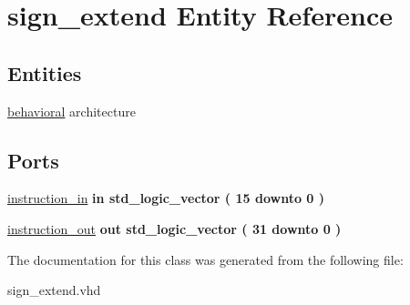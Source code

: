 \hypertarget{classsign__extend}{\section{sign\-\_\-extend \-Entity \-Reference}
\label{classsign__extend}
}
\subsection*{\-Entities}
\begin{DoxyCompactItemize}
\item 
\hyperlink{classsign__extend_1_1behavioral}{behavioral} architecture
\end{DoxyCompactItemize}
\*
\*
\subsection*{\-Ports}
 \begin{DoxyCompactItemize}
\item 
\hypertarget{classsign__extend_aa9a13c51cd81134d998a1f8fbee3010f}{\hyperlink{classsign__extend_aa9a13c51cd81134d998a1f8fbee3010f}{instruction\-\_\-in}  {\bfseries {\bfseries in }} {\bfseries std\-\_\-logic\-\_\-vector (   15    downto    0  ) } }\label{classsign__extend_aa9a13c51cd81134d998a1f8fbee3010f}

\item 
\hypertarget{classsign__extend_aadbe50a01a876c8353e55df1b83bc3c3}{\hyperlink{classsign__extend_aadbe50a01a876c8353e55df1b83bc3c3}{instruction\-\_\-out}  {\bfseries {\bfseries out }} {\bfseries std\-\_\-logic\-\_\-vector (   31    downto    0  ) } }\label{classsign__extend_aadbe50a01a876c8353e55df1b83bc3c3}

\end{DoxyCompactItemize}


\-The documentation for this class was generated from the following file\-:\begin{DoxyCompactItemize}
\item 
sign\-\_\-extend.\-vhd\end{DoxyCompactItemize}
